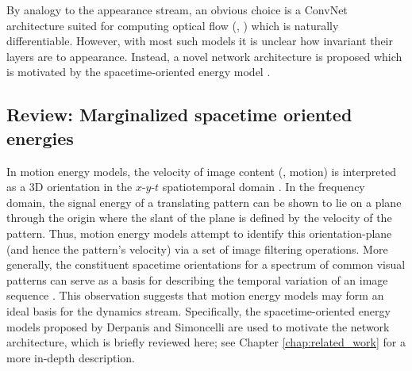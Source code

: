 By analogy to the appearance stream, an obvious choice
is a ConvNet architecture suited for computing
optical flow  (\eg, \cite{dosovitskiy2015,ilg2017}) which
is naturally differentiable.
However, with most such models it is unclear how invariant
their layers are to appearance.
Instead, a novel network architecture is proposed which is
motivated by the spacetime-oriented energy model
\cite{derpanis2012spacetime,simoncelli1998}. 

\subsection{Review: Marginalized spacetime oriented energies}

In motion energy models, the velocity of image content (\ie, motion)
is interpreted as a 3D orientation in the $x$-$y$-$t$
spatiotemporal domain
\cite{adelson1985spatiotemporal,fahle1981,heeger1988,simoncelli1998,watson1983}. 
In the frequency domain, the signal energy of a translating
pattern can be shown to lie on a plane through the origin
where the slant of the plane is defined by the velocity of
the  pattern. 
Thus, motion energy models attempt to identify this 
orientation-plane (and hence the pattern's velocity) via
a set of image filtering operations.
More generally,
the constituent
spacetime orientations for a spectrum of common
visual patterns can serve as a basis for describing the temporal
variation of an image sequence \cite{derpanis2012spacetime}.
This observation suggests that motion energy models may form an
ideal basis for the dynamics stream. Specifically, the spacetime-oriented energy models proposed by Derpanis \etal \cite{derpanis2012spacetime}
and Simoncelli \etal \cite{simoncelli1998} are used to motivate the
network architecture, which is briefly reviewed here; 
see Chapter \ref{chap:related_work}  for a more in-depth description.

